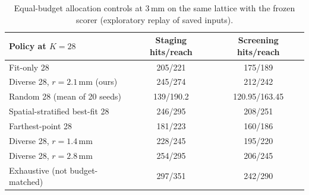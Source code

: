 \begin{table}[!t]
\centering
\small
\caption{Equal-budget allocation controls at 3\,mm on the same lattice with the frozen scorer (exploratory replay of saved inputs).}
\label{tab:alloc}
\begin{tabular}{@{}lcc@{}}
\toprule
Policy at $K{=}28$ & Staging hits/reach & Screening hits/reach \\
\midrule
Fit-only 28 & 205/221 & 175/189 \\
Diverse 28, $r{=}2.1$\,mm (ours) & 245/274 & 212/242 \\
Random 28 (mean of 20 seeds) & 139/190.2 & 120.95/163.45 \\
Spatial-stratified best-fit 28 & 246/295 & 208/251 \\
Farthest-point 28 & 181/223 & 160/186 \\
Diverse 28, $r{=}1.4$\,mm & 228/245 & 195/220 \\
Diverse 28, $r{=}2.8$\,mm & 254/295 & 206/245 \\
\midrule
Exhaustive (not budget-matched) & 297/351 & 242/290 \\
\bottomrule
\end{tabular}
\end{table}
